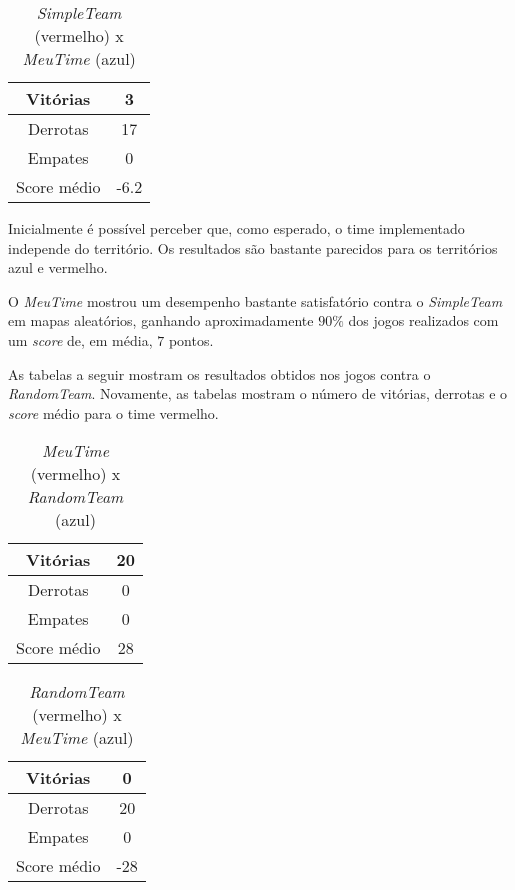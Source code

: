 \documentclass[a4paper,12pt]{article}
\begin{document}
\begin{table}[htb!]
    {\centering
    \begin{tabular}{|c|c|} \hline
    Vitórias     & 3    \\ \hline
    Derrotas     & 17   \\ \hline
    Empates      & 0    \\ \hline
    Score médio  & -6.2 \\ \hline
    \end{tabular}
    \caption{\textit{SimpleTeam} (vermelho) x \textit{MeuTime} (azul)}
    }
\end{table}

Inicialmente é possível perceber que, como esperado, o time implementado independe do
território. Os resultados são bastante parecidos para os territórios azul e vermelho.

O \textit{MeuTime} mostrou um desempenho bastante satisfatório contra o \textit{SimpleTeam}
em mapas aleatórios, ganhando aproximadamente $90\%$ dos jogos realizados com
um \textit{score} de, em média, $7$ pontos.

As tabelas a seguir mostram os resultados obtidos nos jogos contra o \textit{RandomTeam}.
Novamente, as tabelas mostram o número de vitórias, derrotas e o \textit{score} médio
para o time vermelho.

\begin{table}[htb!]
    {\centering
    \begin{tabular}{|c|c|} \hline
    Vitórias     & 20 \\ \hline
    Derrotas     & 0  \\ \hline
    Empates      & 0  \\ \hline
    Score médio  & 28 \\ \hline
    \end{tabular}
    \caption{\textit{MeuTime} (vermelho) x \textit{RandomTeam} (azul)}
    }
\end{table}

\begin{table}[htb!]
    {\centering
    \begin{tabular}{|c|c|} \hline
    Vitórias     & 0   \\ \hline
    Derrotas     & 20  \\ \hline
    Empates      & 0   \\ \hline
    Score médio  & -28 \\ \hline
    \end{tabular}
    \caption{\textit{RandomTeam} (vermelho) x \textit{MeuTime} (azul)}
    }
\end{table}
\end{document}
